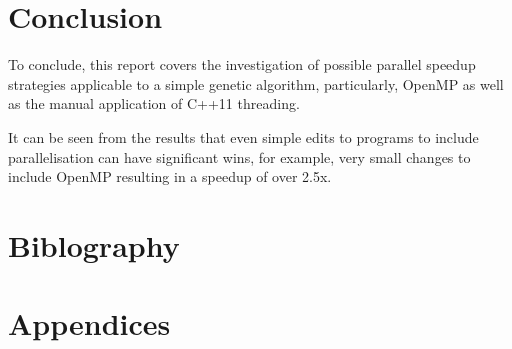 \documentclass[a4paper]{article}
\begin{document}
    \section{Conclusion}
    To conclude, this report covers the investigation of possible parallel speedup strategies applicable to a simple
    genetic algorithm, particularly, OpenMP as well as the manual application of C++11 threading.

    It can be seen from the results that even simple edits to programs to include parallelisation can have significant
    wins, for example, very small changes to include OpenMP resulting in a speedup of over 2.5x.

    \section{Biblography}
    
    

    \section{Appendices}
\end{document}
